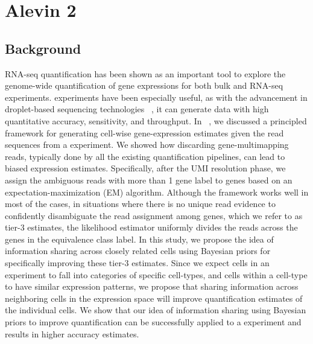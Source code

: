 
\chapter{Alevin 2} %

\label{alevin2} %


\section{Background}

RNA-seq quantification has been shown as an important tool to explore the genome-wide
quantification of gene expressions for both bulk and \singlecell RNA-seq experiments.
\dscrnaseq experiments have been especially useful, as with the advancement in droplet-based 
sequencing technologies ~\citep{dropseq, indrop, tenx}, it can generate data with high 
quantitative accuracy, sensitivity, and throughput. In ~, we discussed a 
principled framework for generating cell-wise gene-expression estimates given the read sequences
from a \dscrnaseq experiment. We showed how discarding gene-multimapping reads, typically done 
by all the existing \dscrnaseq quantification pipelines, can lead to biased expression estimates. 
Specifically, after the UMI resolution phase, we assign the ambiguous reads with more than 1 gene label to
genes based on an expectation-maximization (EM) algorithm. Although the framework works well in most of the cases, 
in situations where there is no unique read evidence to confidently disambiguate the read assignment
among genes, which we refer to as tier-3 estimates, the likelihood estimator uniformly divides the reads 
across the genes in the equivalence class label. In this study, we propose the idea of information sharing across closely 
related cells using Bayesian priors for specifically improving these tier-3 estimates. Since we expect cells in an experiment
to fall into categories of specific cell-types, and cells within a cell-type to have similar expression patterns, we propose that
sharing information across neighboring cells in the expression space will improve quantification 
estimates of the individual cells. We show that our idea of information sharing using Bayesian 
priors to improve quantification can be successfully applied to a \dscrnaseq experiment and results in higher accuracy estimates.

